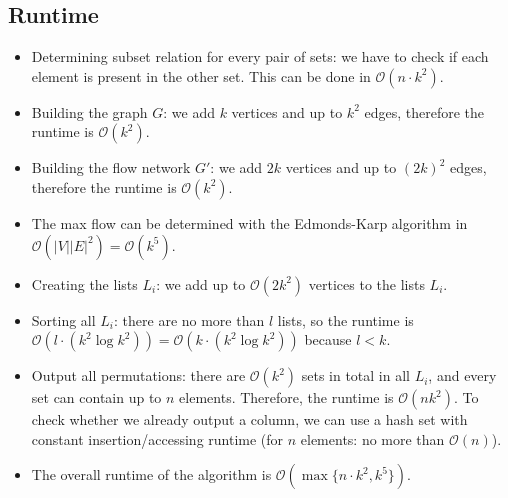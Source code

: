 \documentclass[12pt]{article}
\begin{document}
\subsection*{Runtime}
\begin{itemize}
	\item Determining subset relation for every pair of sets: we have to check if each element is present in the other set. This can be done in $\mathcal{O}(n \cdot k^2)$.
	\item Building the graph $G$: we add $k$ vertices and up to $k^2$ edges, therefore the runtime is $\mathcal{O}(k^2)$.
	\item Building the flow network $G'$: we add $2k$ vertices and up to $(2k)^2$ edges, therefore the runtime is $\mathcal{O}(k^2)$.
	\item The max flow can be determined with the Edmonds-Karp algorithm in $\mathcal{O}(|V| |E|^2) = \mathcal{O}(k^5)$.
	\item Creating the lists $L_i$: we add up to $\mathcal{O}(2 k^2)$ vertices to the lists $L_i$.
	\item Sorting all $L_i$: there are no more than $l$ lists, so the runtime is $\mathcal{O}(l \cdot (k^2 \log k^2)) = \mathcal{O}(k \cdot (k^2 \log k^2))$ because $l < k$.
	\item Output all permutations: there are $\mathcal{O}(k^2)$ sets in total in all $L_i$, and every set can contain up to $n$ elements. Therefore, the runtime is $\mathcal{O}(n k^2)$. To check whether we already output a column, we can use a hash set with constant insertion/accessing runtime (for $n$ elements: no more than $\mathcal{O}(n)$).
	\item The overall runtime of the algorithm is $\mathcal{O}(\max \{n \cdot k^2, k^5 \})$.
\end{itemize}
\end{document}
